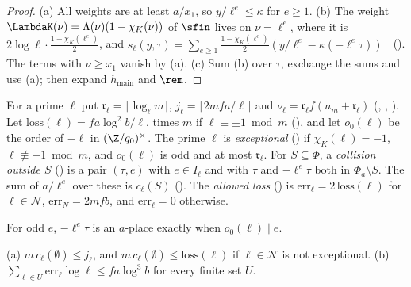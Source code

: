 \begin{proof}
(a) All weights are at least $a/x_1$, so $y/\ell^e\le\kappa$ for $e\ge1$. (b) The weight
$\LambdaK(\nu)=\Lambda(\nu)(1-\chi_K(\nu))$ of $\sfin$ lives on $\nu=\ell^e$, where it is $2\log \ell\cdot\frac{1-\chi_K(\ell^e)}2$,
and $s_\ell(y,\tau)=\sum_{e\ge1}\frac{1-\chi_K(\ell^e)}2(y/\ell^e-\kappa(-\ell^e\tau))_+$
(). The terms with $\nu\ge x_1$ vanish by (a). (c) Sum (b) over
$\tau$, exchange the sums and use (a); then expand $h_{\mathrm{main}}$ and $\rem$.
\end{proof}

\begin{definition}\label{ub-divis:def:classes}
For a prime $\ell$ put $\mathfrak r_\ell=\lceil\log_\ell m\rceil$, $j_\ell=\lceil2mfa/\ell\rceil$ and
$\nu_\ell=\mathfrak r_\ell f(n_m+\mathfrak r_\ell)$ (,
, ). Let $\mathrm{loss}(\ell)=fa\log^2b/\ell$,
times $m$ if $\ell\equiv\pm1\bmod m$ (), and let $o_0(\ell)$ be the order of $-\ell$ in
$(\Z/q_0)^\times$. The prime $\ell$ is \emph{exceptional} () if
$\chi_K(\ell)=-1$, $\ell\not\equiv\pm1\bmod m$, and $o_0(\ell)$ is odd and at most $\mathfrak r_\ell$. For
$S\subseteq\Phi$, a \emph{collision outside $S$} () is a pair
$(\tau,e)$ with $e\in I_\ell$ and with $\tau$ and $-\ell^e\tau$ both in $\Phi_a\setminus S$. The sum of
$a/\ell^e$ over these is $c_\ell(S)$ (). The \emph{allowed loss}
() is $\mathrm{err}_\ell=2\,\mathrm{loss}(\ell)$ for $\ell\in\mathcal N$, $\mathrm{err}_N=2mfb$, and $\mathrm{err}_\ell=0$ otherwise.
\end{definition}

For odd $e$, $-\ell^e\tau$ is an $a$-place exactly when $o_0(\ell)\mid e$.

\begin{lemma}
\label{ub-divis:lem:losses}
(a) $m\,c_\ell(\emptyset)\le j_\ell$, and $m\,c_\ell(\emptyset)\le\mathrm{loss}(\ell)$ if $\ell\in\mathcal N$ is not exceptional. (b) $\sum_{\ell\in U}\mathrm{err}_\ell\log \ell\le fa\log^3b$ for every
finite set $U$.
\end{lemma}


